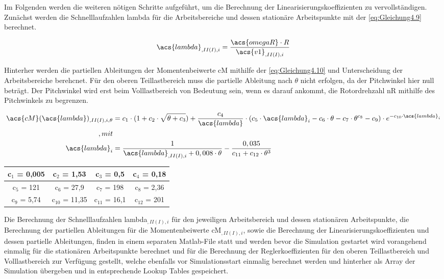 Im Folgenden werden die weiteren nötigen Schritte aufgeführt, um die Berechnung der Linearisierungskoeffizienten zu vervollständigen. Zunächst werden die Schnelllaufzahlen \acs{lambda} für die Arbeitsbereiche und dessen stationäre Arbeitspunkte mit der \autoref{eq:Gleichung4.9} berechnet.

\begin{align}
    \acs{lambda}_{,II(I),i} = \frac{\acs{omegaR} \cdot R}{\acs{v1}_{,II(I),i}}
    \label{eq:Gleichung4.9}
\end{align}

Hinterher werden die partiellen Ableitungen der Momentenbeiwerte \acs{cM} mithilfe der \autoref{eq:Gleichung4.10} und Unterscheidung der Arbeitsbereiche berehcnet. Für den oberen Teillastbereich muss die partielle Ableitung nach $\theta$ nicht erfolgen, da der Pitchwinkel hier null beträgt. Der Pitchwinkel wird erst beim Volllastbereich von Bedeutung sein, wenn es darauf ankommt, die Rotordrehzahl \acs{nR} mithilfe des Pitchwinkels zu begrenzen.

\begin{align}
    \acs{cM}(\acs{lambda})_{,II(I),i,\theta} &= c_1 \cdot (1 + c_2 \cdot \sqrt{\theta + c_3}) + \frac{c_4}{\acs{lambda}}   \cdot (c_5 \cdot \acs{lambda}_i - c_6 \cdot \theta - c_7 \cdot \theta^{c_8} - c_9) \cdot e^{-c_{10} \cdot \acs{lambda}_i}
    \label{eq:Gleichung4.10}\\\enspace ,mit\nonumber\\
    \acs{lambda}_i &= \frac{1}{\acs{lambda}_{,II(I),i} + 0,008 \cdot \theta} - \frac{0,035}{c_{11} + c_{12} \cdot \theta^3}
    \nonumber
\end{align}

{\renewcommand{\arraystretch}{2}%
\begin{table}[H]
    \centering
    \begin{tabular}{|c|c|c|c|}
        \hline
        c$_1$ = 0,005 & c$_2$ = 1,53 & c$_3$ = 0,5 & c$_4$ = 0,18\\\hline
        c$_5$ = 121 & c$_6$ = 27,9 & c$_7$ = 198 & c$_8$ = 2,36\\\hline
        c$_9$ = 5,74& c$_{10}$ = 11,35 & c$_{11}$ = 16,1 & c$_{12}$ = 201\\\hline
    \end{tabular}
\end{table}
}
\newpage

Die Berechnung der Schnelllaufzahlen \acs{lambda}$_{,II(I),i}$ für den jeweiligen Arbeitsbereich und dessen stationären Arbeitspunkte, die Berechnung der partiellen Ableitungen für die Momentenbeiwerte \acs{cM}$_{,II(I),i}$, sowie die Berechnung der Linearisierungskoeffizienten und dessen partielle Ableitungen, finden in einem separaten Matlab-File statt und werden bevor die Simulation gestartet wird vorangehend einmalig für die stationären Arbeitspunkte berechnet und für die Berechnung der Reglerkoeffizienten für den oberen Teillastbereich und Volllastbereich zur Verfügung gestellt, welche ebenfalls vor Simulationsstart einmalig berechnet werden und hinterher als Array der Simulation übergeben und in entsprechende Lookup Tables gespeichert.
